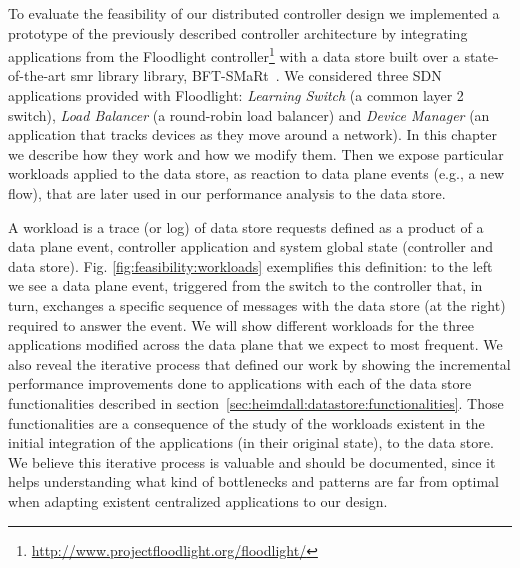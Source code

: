 \label{sec:feasibility:apps}
\glsresetall


To evaluate the feasibility of our distributed controller design we implemented a prototype of the previously described controller architecture by integrating applications from the Floodlight controller\footnote{\url{http://www.projectfloodlight.org/floodlight/}} with a data store built over a state-of-the-art \gls{smr} library library, BFT-SMaRt~\cite{smart-tr}.
We considered three SDN applications provided with Floodlight: \emph{Learning Switch}  (a common layer 2 switch), \emph{Load   Balancer} (a round-robin load balancer) and \emph{Device Manager} (an application that tracks devices as they move around a network).
In this chapter we describe how they work and how we modify them. 
Then we expose particular workloads applied to the data store, as reaction to data plane events (e.g., a new flow), that are later used in our performance analysis to the data store. 



A workload is a trace (or log) of data store requests  defined as a product of a data plane event, controller application and system global state (controller and data store).
Fig. \ref{fig:feasibility:workloads} exemplifies this definition: to the left we see a data plane event, triggered from the switch to the controller that, in turn, exchanges a specific sequence of messages with the data store (at the right) required to answer the event.
We will show different workloads for the three applications modified across the data plane that we expect to most frequent. We also reveal the iterative process that defined our work by showing the incremental performance improvements done to applications with each of the data store functionalities described in section~\ref{sec:heimdall:datastore:functionalities}. Those functionalities are a consequence of the study of the workloads existent in the initial integration of the applications (in their original state), to the data store. We believe this iterative process is valuable and should be documented, since it helps understanding what kind of bottlenecks and patterns are far from optimal when adapting existent centralized applications to our design.  


